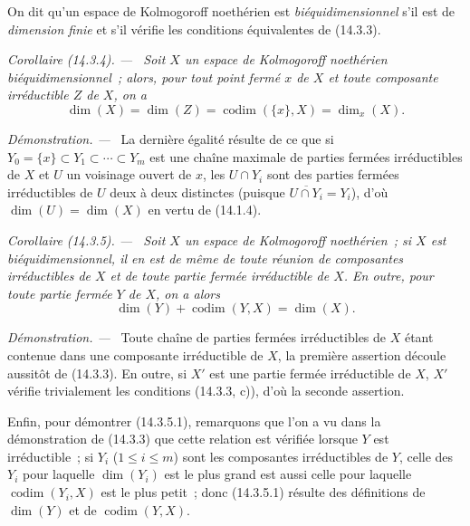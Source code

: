 \documentclass[10pt,oneside]{book}
\makeatletter
\newcommand{\setmanualcurrentlabel}[1]{\def\@currentlabel{#1}}
\newcommand{\oldpage}[2][]{%
  \setcounter{footnote}{0}%
  \marginpar{\scriptsize\textbf{#1}~|~#2}\ignorespaces}
\newenvironment{corollary}[1][]{%
  \setmanualcurrentlabel{#1}\par\medskip\noindent\itshape Corollaire (#1). ---\ }{\par}
\newenvironment{proof}{%
  \par\medskip\noindent\textit{Démonstration. ---\ }}{\par}
\makeatother
\begin{document}
On dit qu'un espace de Kolmogoroff noethérien est \emph{biéquidimensionnel}
s'il est de \emph{dimension finie} et s'il vérifie les conditions équivalentes
de (14.3.3).

\begin{corollary}[14.3.4]
\label{0.14.3.4-fr}
Soit $X$ un espace de Kolmogoroff noethérien biéquidimensionnel~; alors, pour
tout point fermé $x$ de $X$ et toute composante irréductible $Z$ de $X$, on a
\[
  \dim(X)=\dim(Z)=\operatorname{codim}(\{x\},X)=\dim_x(X).
  \tag{14.3.4.1}\label{0.14.3.4.1-fr}
\]
\end{corollary}

\oldpage[0\textsubscript{IV-1}]{12}
\begin{proof}
La dernière égalité résulte de ce que si
$Y_0=\{x\}\subset Y_1\subset\cdots\subset Y_m$ est une chaîne maximale de
parties fermées irréductibles de $X$ et $U$ un voisinage ouvert de $x$, les
$U\cap Y_i$ sont des parties fermées irréductibles de $U$ deux à deux
distinctes (puisque $\overline{U\cap Y_i}=Y_i$), d'où
$\dim(U)=\dim(X)$ en vertu de (14.1.4).
\end{proof}

\begin{corollary}[14.3.5]
\label{0.14.3.5-fr}
Soit $X$ un espace de Kolmogoroff noethérien~; si $X$ est
biéquidimensionnel, il en est de même de toute réunion de composantes
irréductibles de $X$ et de toute partie fermée irréductible de $X$. En outre,
pour toute partie fermée $Y$ de $X$, on a alors
\[
  \dim(Y)+\operatorname{codim}(Y,X)=\dim(X).
  \tag{14.3.5.1}\label{0.14.3.5.1-fr}
\]
\end{corollary}

\begin{proof}
Toute chaîne de parties fermées irréductibles de $X$ étant contenue dans une
composante irréductible de $X$, la première assertion découle aussitôt de
(14.3.3). En outre, si $X'$ est une partie fermée irréductible de $X$, $X'$
vérifie trivialement les conditions (14.3.3, c)), d'où la seconde assertion.

Enfin, pour démontrer (14.3.5.1), remarquons que l'on a vu dans la
démonstration de (14.3.3) que cette relation est vérifiée lorsque $Y$ est
irréductible~; si $Y_i$ ($1\leq i\leq m$) sont les composantes irréductibles
de $Y$, celle des $Y_i$ pour laquelle $\dim(Y_i)$ est le plus grand est aussi
celle pour laquelle $\operatorname{codim}(Y_i,X)$ est le plus petit~; donc
(14.3.5.1) résulte des définitions de $\dim(Y)$ et de
$\operatorname{codim}(Y,X)$.
\end{proof}
\end{document}

